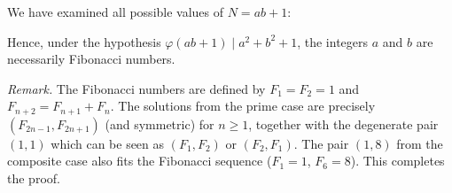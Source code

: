 \smallskip
{}
We have examined all possible values of \(N = ab+1\):\par
{}
Hence, under the hypothesis \(\varphi(ab+1) \mid a^{2}+b^{2}+1\), the integers \(a\) and \(b\) are necessarily Fibonacci numbers.\par
\smallskip
\emph{Remark.} The Fibonacci numbers are defined by \(F_1=F_2=1\) and \(F_{n+2}=F_{n+1}+F_n\). The solutions from the prime case are precisely \((F_{2n-1},F_{2n+1})\) (and symmetric) for \(n \ge 1\), together with the degenerate pair \((1,1)\) which can be seen as \((F_1,F_2)\) or \((F_2,F_1)\). The pair \((1,8)\) from the composite case also fits the Fibonacci sequence (\(F_1=1\), \(F_6=8\)). This completes the proof.\par
\par
